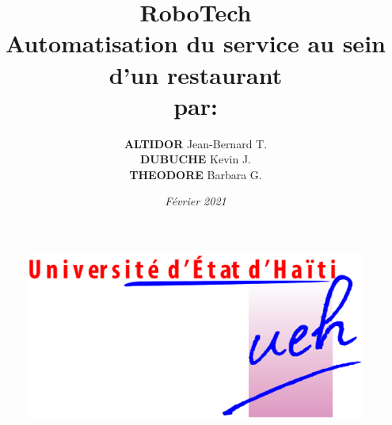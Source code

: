 \documentclass[a4paper,12pt]{report}
\begin{document}
\begin{figure}[!tbp]
    \centering
    \hfill
\end{figure}

\begin{figure}[h]
    \centering
    \includegraphics[width=1\textwidth]{logo_ueh.jpg}
    \label{image-lib}
\end{figure}


\title{\textbf{RoboTech} \\ Automatisation du service au sein d'un restaurant \\ par:}
\author{\textbf{ALTIDOR} Jean-Bernard T. \\ \textbf{DUBUCHE} Kevin J. \\ \textbf{THEODORE} Barbara G.}
\date{\textit{Février 2021}}
\maketitle
\end{document}
